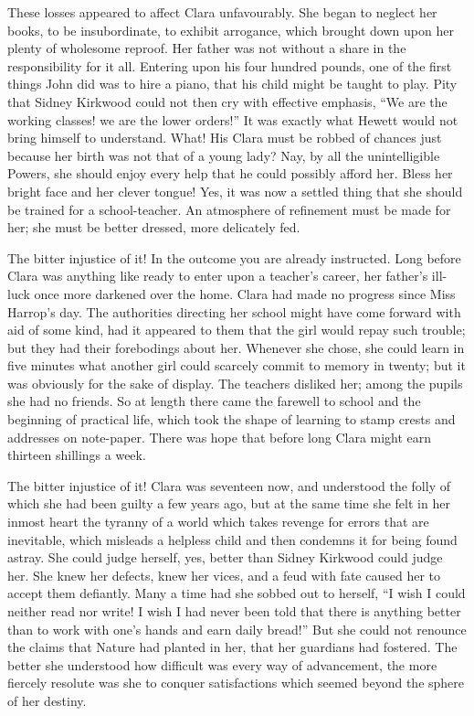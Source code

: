 These losses appeared to affect Clara unfavourably. She began to neglect
her books, to be insubordinate, to exhibit arrogance, which brought down
upon her plenty of {}wholesome reproof. Her father was not without a
share in the responsibility for it all. Entering upon his four hundred
pounds, one of the first things John did was to hire a piano, that his
child might be taught to play. Pity that Sidney Kirkwood could not then
cry with effective emphasis, ``We are the working classes! we are the
lower orders!'' It was exactly what Hewett would not bring himself to
understand. What! His Clara must be robbed of chances just because her
birth was not that of a young lady? Nay, by all the unintelligible
Powers, she should enjoy every help that he could possibly afford her.
Bless her bright face and her clever tongue! Yes, it was now a settled
thing that she should be trained for a school-teacher. An atmosphere of
refinement must be made for her; she must be better dressed, more
delicately fed.

The bitter injustice of it! In the outcome you are already instructed.
Long before Clara was anything like ready to enter upon a teacher's
career, her father's ill-luck once {}more darkened over the home. Clara
had made no progress since Miss Harrop's day. The authorities directing
her school might have come forward with aid of some kind, had it
appeared to them that the girl would repay such trouble; but they had
their forebodings about her. Whenever she chose, she could learn in five
minutes what another girl could scarcely commit to memory in twenty; but
it was obviously for the sake of display. The teachers disliked her;
among the pupils she had no friends. So at length there came the
farewell to school and the beginning of practical life, which took the
shape of learning to stamp crests and addresses on note-paper. There was
hope that before long Clara might earn thirteen shillings a week.

The bitter injustice of it! Clara was seventeen now, and understood the
folly of which she had been guilty a few years ago, but at the same time
she felt in her inmost heart the tyranny of a world which takes revenge
for errors that are inevitable, which misleads a {}helpless child and
then condemns it for being found astray. She could judge herself, yes,
better than Sidney Kirkwood could judge her. She knew her defects, knew
her vices, and a feud with fate caused her to accept them defiantly.
Many a time had she sobbed out to herself, ``I wish I could neither read
nor write! I wish I had never been told that there is anything better
than to work with one's hands and earn daily bread!'' But she could not
renounce the claims that Nature had planted in her, that her guardians
had fostered. The better she understood how difficult was every way of
advancement, the more fiercely resolute was she to conquer satisfactions
which seemed beyond the sphere of her destiny.

